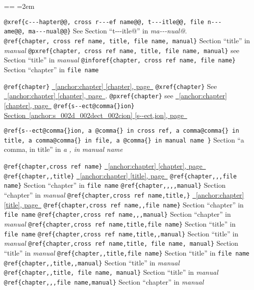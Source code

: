 \documentclass{book}
\makeatletter
\newenvironment{GNUTexinfopreformatted}{%
  \par\obeylines\obeyspaces\frenchspacing
  \parskip=\z@\parindent=\z@}{}
\makeatother
\begin{document}
\begin{GNUTexinfopreformatted}
\leftskip=2em\relax\ttfamily%


\texttt{@xref\{c{-}{-}{-}hapter@@,\ cross r{-}{-}{-}ef name@@,\ t{-}{-}{-}itle@@,\ file n{-}{-}{-}ame@@,\ ma{-}{-}{-}nual@@\}} See Section ``t{-}{-}{-}itle@'' in \textsl{ma{-}{-}{-}nual@}.
\texttt{@ref\{chapter,\ cross ref name,\ title,\ file name,\ manual\}} Section ``title'' in \textsl{manual}
\texttt{@pxref\{chapter,\ cross ref name,\ title,\ file name,\ manual\}} see Section ``title'' in \textsl{manual}
\texttt{@inforef\{chapter,\ cross ref name,\ file name\}} Section ``chapter'' in \texttt{file name}

\texttt{@ref\{chapter\}} \hyperref[anchor:chapter]{\chaptername~\ref*{anchor:chapter} [chapter], page~\pageref*{anchor:chapter}}
\texttt{@xref\{chapter\}} See \hyperref[anchor:chapter]{\chaptername~\ref*{anchor:chapter} [chapter], page~\pageref*{anchor:chapter}}.
\texttt{@pxref\{chapter\}} see \hyperref[anchor:chapter]{\chaptername~\ref*{anchor:chapter} [chapter], page~\pageref*{anchor:chapter}}
\texttt{@ref\{s{-}{-}ect@comma\{\}ion\}} \hyperref[anchor:s_002d_002dect_002cion]{Section~\ref*{anchor:s_002d_002dect_002cion} [s{-}{-}ect,ion], page~\pageref*{anchor:s_002d_002dect_002cion}}

\texttt{@ref\{s{-}{-}ect@comma\{\}ion,\ a @comma\{\} in cross
ref,\ a comma@comma\{\} in title,\ a comma@comma\{\} in file,\ a @comma\{\} in manual name \}}
Section ``a comma, in title'' in \textsl{a , in manual name}

\texttt{@ref\{chapter,cross ref name\}} \hyperref[anchor:chapter]{\chaptername~\ref*{anchor:chapter} [chapter], page~\pageref*{anchor:chapter}}
\texttt{@ref\{chapter{,}{,}title\}} \hyperref[anchor:chapter]{\chaptername~\ref*{anchor:chapter} [title], page~\pageref*{anchor:chapter}}
\texttt{@ref\{chapter{,}{,},file name\}} Section ``chapter'' in \texttt{file name}
\texttt{@ref\{chapter{,}{,}{,}{,}manual\}} Section ``chapter'' in \textsl{manual}
\texttt{@ref\{chapter,cross ref name,title,\}} \hyperref[anchor:chapter]{\chaptername~\ref*{anchor:chapter} [title], page~\pageref*{anchor:chapter}}
\texttt{@ref\{chapter,cross ref name{,}{,}file name\}} Section ``chapter'' in \texttt{file name}
\texttt{@ref\{chapter,cross ref name{,}{,},manual\}} Section ``chapter'' in \textsl{manual}
\texttt{@ref\{chapter,cross ref name,title,file name\}} Section ``title'' in \texttt{file name}
\texttt{@ref\{chapter,cross ref name,title{,}{,}manual\}} Section ``title'' in \textsl{manual}
\texttt{@ref\{chapter,cross ref name,title,\ file name,\ manual\}} Section ``title'' in \textsl{manual}
\texttt{@ref\{chapter{,}{,}title,file name\}} Section ``title'' in \texttt{file name}
\texttt{@ref\{chapter{,}{,}title{,}{,}manual\}} Section ``title'' in \textsl{manual}
\texttt{@ref\{chapter{,}{,}title,\ file name,\ manual\}} Section ``title'' in \textsl{manual}
\texttt{@ref\{chapter{,}{,},file name,manual\}} Section ``chapter'' in \textsl{manual}



\end{GNUTexinfopreformatted}
\end{document}
